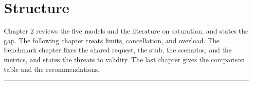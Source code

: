 \section{Structure}

Chapter 2 reviews the five models and the literature on saturation, and states the gap. The following chapter treats limits, cancellation, and overload. The benchmark chapter fixes the shared request, the stub, the scenarios, and the metrics, and states the threats to validity. The last chapter gives the comparison table and the recommendations.

\vspace{0.5em}\noindent\rule{\textwidth}{0.5pt}\vspace{0.5em}

